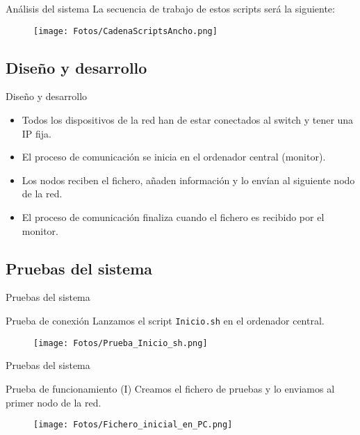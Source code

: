\documentclass[aspectratio=169]{beamer}
\begin{document}
\begin{frame}{Análisis del sistema}
	La secuencia de trabajo de estos scripts será la siguiente:
	\begin{figure}[h]
		\centering
		\texttt{[image: Fotos/CadenaScriptsAncho.png]}
	\end{figure}
\end{frame}

\subsection{Diseño y desarrollo}
\begin{frame}{Diseño y desarrollo}
\begin{itemize}
	\item Todos los dispositivos de la red han de estar conectados al switch y tener una IP fija.
	\item El proceso de comunicación se inicia en el ordenador central (monitor).
	\item Los nodos reciben el fichero, añaden información y lo envían al siguiente nodo de la red.
	\item El proceso de comunicación finaliza cuando el fichero es recibido por el monitor.
\end{itemize}
\end{frame}

\subsection{Pruebas del sistema}
\begin{frame}{Pruebas del sistema}
\begin{block}{Prueba de conexión}
	Lanzamos el script \texttt{Inicio.sh} en el ordenador central.
	\begin{figure}[h]
		\texttt{[image: Fotos/Prueba\_Inicio\_sh.png]}
	\end{figure}
\end{block}
\end{frame}

\begin{frame}{Pruebas del sistema}
\begin{block}{Prueba de funcionamiento (I)}
	Creamos el fichero de pruebas y lo enviamos al primer nodo de la red.
	\begin{figure}[h]
		\centering
		\texttt{[image: Fotos/Fichero\_inicial\_en\_PC.png]}
	\end{figure}
\end{block}
\end{frame}
\end{document}
